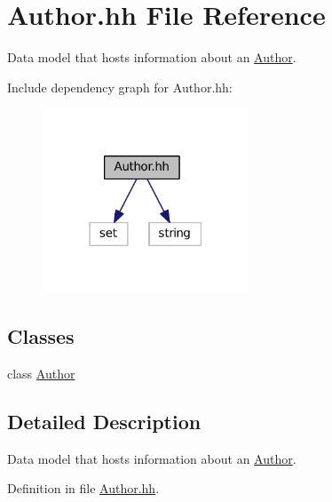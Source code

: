 \hypertarget{_author_8hh}{\section{Author.\+hh File Reference}
\label{_author_8hh}
}


Data model that hosts information about an \hyperlink{class_author}{Author}.  


Include dependency graph for Author.\+hh\+:
\nopagebreak
\begin{figure}[H]
\begin{center}
\leavevmode
\includegraphics[width=174pt]{_author_8hh__incl}
\end{center}
\end{figure}
\subsection*{Classes}
\begin{DoxyCompactItemize}
\item 
class \hyperlink{class_author}{Author}
\end{DoxyCompactItemize}


\subsection{Detailed Description}
Data model that hosts information about an \hyperlink{class_author}{Author}. 



Definition in file \hyperlink{_author_8hh_source}{Author.\+hh}.

